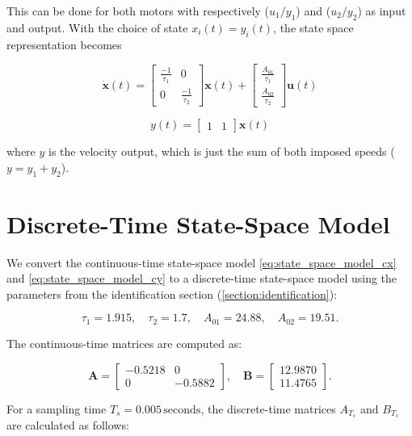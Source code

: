 This can be done for both motors with respectively ($u_1/y_1$) and ($u_2/y_2$) as input and output. With the choice of 
state $x_i(t) = y_i(t)$, the state space representation becomes

\begin{equation}
    \dot{\mathbf{x}}(t) = \begin{bmatrix}
    \frac{-1}{\tau_1} & 0 \\ 
    0 & \frac{-1}{\tau_2}
    \end{bmatrix} \mathbf{x}(t) + \begin{bmatrix} 
    \frac{A_{01}}{\tau_1} \\ 
    \frac{A_{02}}{\tau_2} 
    \end{bmatrix}\mathbf{u}(t)
    \label{eq:state_space_model_cx}
\end{equation}

\begin{equation}
    y(t) = \begin{bmatrix} 1 & 1 \end{bmatrix}\mathbf{x}(t)
    \label{eq:state_space_model_cy}
\end{equation}

where \( y \) is the velocity output, which is just the sum of both imposed speeds ($y = y_1 + y_2$).

\section{Discrete-Time State-Space Model}
We convert the continuous-time state-space model \eqref{eq:state_space_model_cx} and \eqref{eq:state_space_model_cy} to 
a discrete-time state-space model using the parameters from the identification section (\ref{section:identification}):

\[
\tau_1 = 1.915, \quad \tau_2 = 1.7, \quad A_{01} = 24.88, \quad A_{02} = 19.51.
\]

The continuous-time matrices are computed as:

\[
\mathbf{A} = 
\begin{bmatrix}
-0.5218 & 0 \\
0 & -0.5882
\end{bmatrix}, \quad 
\mathbf{B} = 
\begin{bmatrix}
12.9870 \\
11.4765
\end{bmatrix}.
\]

For a sampling time \( T_s = 0.005 \, \text{seconds} \), the discrete-time matrices \( A_{T_s} \) and \( B_{T_s} \) are calculated as follows:

